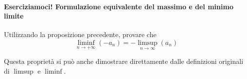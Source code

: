 \paragraph{Eserciziamoci! Formulazione equivalente del massimo e del minimo limite}
\begin{exercisewt}\label{maxminlegame}
	Utilizzando la proposizione precedente, provare che
	\begin{equation}
		\liminf_{n\to +\infty}\left(-a_n\right)=-\limsup_{n\to\infty}\left(a_n\right)
	\end{equation}
\end{exercisewt}
\begin{observe}
	Questa proprietà si può anche dimostrare direttamente dalle definizioni originali di $\limsup$ e $\liminf$.
\end{observe}
